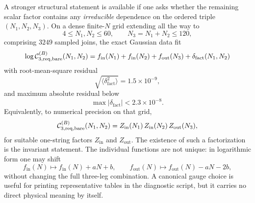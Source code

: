 \documentclass[11pt]{article}
\numberwithin{equation}{section}
\begin{document}
A stronger structural statement is available if one asks whether the remaining scalar factor contains any \emph{irreducible} dependence on the ordered triple $(N_1,N_2,N_3)$. On a dense finite-$N$ grid extending all the way to
\begin{equation}
\label{eq:s12-1-026}
4\le N_1,N_2\le 60,
\qquad
N_3=N_1+N_2\le 120,
\end{equation}
comprising $3249$ sampled joins, the exact Gaussian data fit
\begin{equation}
\label{eq:s12-1-027}
\log {\cal C}^{(B)}_{3,\mathrm{req,bare}}(N_1,N_2)
=
f_{\mathrm{in}}(N_1)+f_{\mathrm{in}}(N_2)+f_{\mathrm{out}}(N_3)
+\delta_{\mathrm{fact}}(N_1,N_2)
\end{equation}
with root-mean-square residual
\begin{equation}
\label{eq:s12-1-028}
\sqrt{\bigl\langle \delta_{\mathrm{fact}}^2\bigr\rangle}
=1.5\times 10^{-9},
\end{equation}
and maximum absolute residual below
\begin{equation}
\label{eq:s12-1-029}
\max |\delta_{\mathrm{fact}}| < 2.3\times 10^{-8}.
\end{equation}
Equivalently, to numerical precision on that grid,
\begin{equation}
\label{eq:s12-1-030}
{\cal C}^{(B)}_{3,\mathrm{req,bare}}(N_1,N_2)
=
Z_{\mathrm{in}}(N_1)\,Z_{\mathrm{in}}(N_2)\,Z_{\mathrm{out}}(N_3),
\end{equation}
for suitable one-string factors $Z_{\mathrm{in}}$ and $Z_{\mathrm{out}}$.
The existence of such a factorization is the invariant statement. The individual functions are not unique: in logarithmic form one may shift
\begin{equation}
\label{eq:s12-1-031}
f_{\mathrm{in}}(N)\mapsto f_{\mathrm{in}}(N)+aN+b,
\qquad
f_{\mathrm{out}}(N)\mapsto f_{\mathrm{out}}(N)-aN-2b,
\end{equation}
without changing the full three-leg combination. A canonical gauge choice is useful for printing representative tables in the diagnostic script, but it carries no direct physical meaning by itself.
\end{document}
